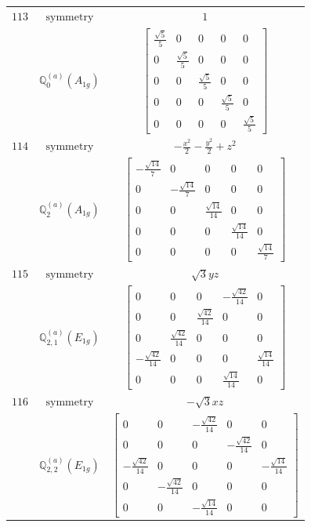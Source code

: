 \documentclass[fleqn,8pt,landscape]{jsarticle}
\begin{document}
\begin{longtable}{ccc}
$ 113 $ & $ \text{symmetry} $ & $ 1 $ \\
$  $ & $ \mathbb{Q}_{0}^{(a)}(A_{1g}) $ & $ \begin{bmatrix} \frac{\sqrt{5}}{5} & 0 & 0 & 0 & 0 \\ 0 & \frac{\sqrt{5}}{5} & 0 & 0 & 0 \\ 0 & 0 & \frac{\sqrt{5}}{5} & 0 & 0 \\ 0 & 0 & 0 & \frac{\sqrt{5}}{5} & 0 \\ 0 & 0 & 0 & 0 & \frac{\sqrt{5}}{5} \end{bmatrix} $ \\ \hline
$ 114 $ & $ \text{symmetry} $ & $ - \frac{x^{2}}{2} - \frac{y^{2}}{2} + z^{2} $ \\
$  $ & $ \mathbb{Q}_{2}^{(a)}(A_{1g}) $ & $ \begin{bmatrix} - \frac{\sqrt{14}}{7} & 0 & 0 & 0 & 0 \\ 0 & - \frac{\sqrt{14}}{7} & 0 & 0 & 0 \\ 0 & 0 & \frac{\sqrt{14}}{14} & 0 & 0 \\ 0 & 0 & 0 & \frac{\sqrt{14}}{14} & 0 \\ 0 & 0 & 0 & 0 & \frac{\sqrt{14}}{7} \end{bmatrix} $ \\ \hline
$ 115 $ & $ \text{symmetry} $ & $ \sqrt{3} y z $ \\
$  $ & $ \mathbb{Q}_{2,1}^{(a)}(E_{1g}) $ & $ \begin{bmatrix} 0 & 0 & 0 & - \frac{\sqrt{42}}{14} & 0 \\ 0 & 0 & \frac{\sqrt{42}}{14} & 0 & 0 \\ 0 & \frac{\sqrt{42}}{14} & 0 & 0 & 0 \\ - \frac{\sqrt{42}}{14} & 0 & 0 & 0 & \frac{\sqrt{14}}{14} \\ 0 & 0 & 0 & \frac{\sqrt{14}}{14} & 0 \end{bmatrix} $ \\ \hline
$ 116 $ & $ \text{symmetry} $ & $ - \sqrt{3} x z $ \\
$  $ & $ \mathbb{Q}_{2,2}^{(a)}(E_{1g}) $ & $ \begin{bmatrix} 0 & 0 & - \frac{\sqrt{42}}{14} & 0 & 0 \\ 0 & 0 & 0 & - \frac{\sqrt{42}}{14} & 0 \\ - \frac{\sqrt{42}}{14} & 0 & 0 & 0 & - \frac{\sqrt{14}}{14} \\ 0 & - \frac{\sqrt{42}}{14} & 0 & 0 & 0 \\ 0 & 0 & - \frac{\sqrt{14}}{14} & 0 & 0 \end{bmatrix} $ \\ \hline

\end{longtable}
\end{document}
